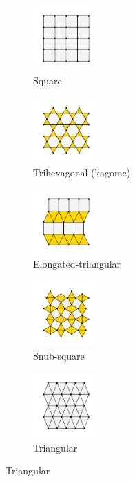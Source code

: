 \begin{figure}[bt]
     \centering
     
     \begin{subfigure}[b]{0.3\textwidth}
         \centering
         \includegraphics[height=2.5cm]{./figures/procrystals/sq.pdf}
         \caption{Square}
         \label{fig:symlatsq}
     \end{subfigure}
     \begin{subfigure}[b]{0.3\textwidth}
         \centering
         \includegraphics[height=2.5cm]{./figures/procrystals/trihex.pdf}
         \caption{Trihexagonal (kagome)}
         \label{fig:symlattrihex}
     \end{subfigure}
     \hfill
     
     \vspace{0.5cm}
     
     \begin{subfigure}[b]{0.3\textwidth}
         \centering
         \includegraphics[height=2.5cm]{./figures/procrystals/elongtri.pdf}
         \caption{Elongated\--triangular}
         \label{fig:symlatelong}
     \end{subfigure}
     \hfill
     \begin{subfigure}[b]{0.3\textwidth}
         \centering
         \includegraphics[height=2.5cm]{./figures/procrystals/snub.pdf}
         \caption{Snub\--square}
         \label{fig:symlatsnub}
     \end{subfigure}
     \hfill
     \begin{subfigure}[b]{0.3\textwidth}
         \centering
         \includegraphics[height=2.5cm]{./figures/procrystals/tri.pdf}
         \caption{Triangular}
         \label{fig:symlattri}
     \end{subfigure}
     \hfill


\end{figure}
